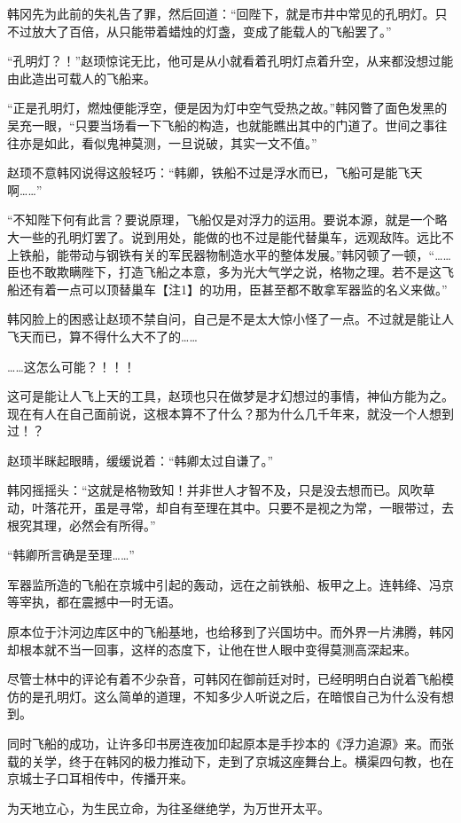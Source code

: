 韩冈先为此前的失礼告了罪，然后回道：“回陛下，就是市井中常见的孔明灯。只不过放大了百倍，从只能带着蜡烛的灯盏，变成了能载人的飞船罢了。”

“孔明灯？！”赵顼惊诧无比，他可是从小就看着孔明灯点着升空，从来都没想过能由此造出可载人的飞船来。

“正是孔明灯，燃烛便能浮空，便是因为灯中空气受热之故。”韩冈瞥了面色发黑的吴充一眼，“只要当场看一下飞船的构造，也就能瞧出其中的门道了。世间之事往往亦是如此，看似鬼神莫测，一旦说破，其实一文不值。”

赵顼不意韩冈说得这般轻巧：“韩卿，铁船不过是浮水而已，飞船可是能飞天啊……”

“不知陛下何有此言？要说原理，飞船仅是对浮力的运用。要说本源，就是一个略大一些的孔明灯罢了。说到用处，能做的也不过是能代替巢车，远观敌阵。远比不上铁船，能带动与钢铁有关的军民器物制造水平的整体发展。”韩冈顿了一顿，“……臣也不敢欺瞒陛下，打造飞船之本意，多为光大气学之说，格物之理。若不是这飞船还有着一点可以顶替巢车【注1】的功用，臣甚至都不敢拿军器监的名义来做。”

韩冈脸上的困惑让赵顼不禁自问，自己是不是太大惊小怪了一点。不过就是能让人飞天而已，算不得什么大不了的……

……这怎么可能？！！！

这可是能让人飞上天的工具，赵顼也只在做梦是才幻想过的事情，神仙方能为之。现在有人在自己面前说，这根本算不了什么？那为什么几千年来，就没一个人想到过！？

赵顼半眯起眼睛，缓缓说着：“韩卿太过自谦了。”

韩冈摇摇头：“这就是格物致知！并非世人才智不及，只是没去想而已。风吹草动，叶落花开，虽是寻常，却自有至理在其中。只要不是视之为常，一眼带过，去根究其理，必然会有所得。”

“韩卿所言确是至理……”

军器监所造的飞船在京城中引起的轰动，远在之前铁船、板甲之上。连韩绛、冯京等宰执，都在震撼中一时无语。

原本位于汴河边库区中的飞船基地，也给移到了兴国坊中。而外界一片沸腾，韩冈却根本就不当一回事，这样的态度下，让他在世人眼中变得莫测高深起来。

尽管士林中的评论有着不少杂音，可韩冈在御前廷对时，已经明明白白说着飞船模仿的是孔明灯。这么简单的道理，不知多少人听说之后，在暗恨自己为什么没有想到。

同时飞船的成功，让许多印书房连夜加印起原本是手抄本的《浮力追源》来。而张载的关学，终于在韩冈的极力推动下，走到了京城这座舞台上。横渠四句教，也在京城士子口耳相传中，传播开来。

为天地立心，为生民立命，为往圣继绝学，为万世开太平。

